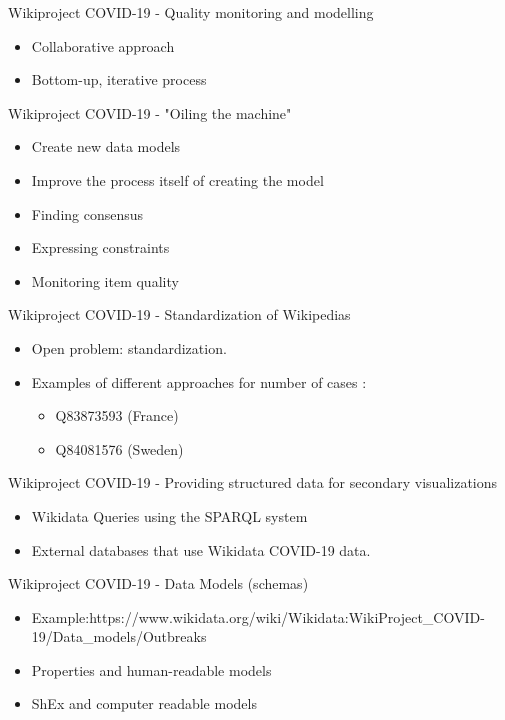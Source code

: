 \documentclass{beamer}
\begin{document}
\begin{frame}{Wikiproject COVID-19 - Quality monitoring and modelling}
\begin{itemize}
    \item Collaborative approach
    \item Bottom-up, iterative process
\end{itemize}
\end{frame}


\begin{frame}{Wikiproject COVID-19 - "Oiling the machine"}
\begin{itemize}
    \item Create new data models 
    \item Improve the process itself of creating the model
    \item Finding consensus
    \item Expressing constraints
    \item Monitoring item quality
\end{itemize}
\end{frame}

\begin{frame}{Wikiproject COVID-19 - Standardization of Wikipedias}

\begin{itemize}
    \item Open problem: standardization. 
    \item Examples of different approaches for number of cases :
    \begin{itemize}
        \item Q83873593 (France) 
        \item Q84081576 (Sweden)
    \end{itemize}
\end{itemize}
\end{frame}

\begin{frame}{Wikiproject COVID-19 - Providing structured data for secondary visualizations}
\begin{itemize}
    \item Wikidata Queries using the SPARQL system 
    \item External databases that use Wikidata COVID-19 data.
\end{itemize}
\end{frame}



\begin{frame}{Wikiproject COVID-19 - Data Models (schemas) }
\begin{itemize}
    \item Example:https://www.wikidata.org/wiki/Wikidata:WikiProject\_COVID-19/Data\_models/Outbreaks
    \item Properties and human-readable models
    \item ShEx and computer readable models
\end{itemize}
\end{frame}
\end{document}
